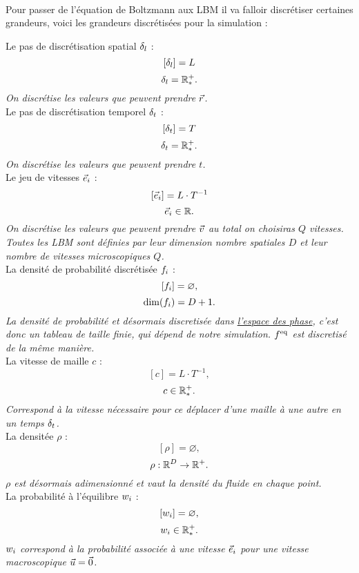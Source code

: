\paragraph*{}
  Pour passer de l'équation de Boltzmann aux LBM il va falloir discrétiser certaines grandeurs, voici les grandeurs
  discrétisées pour la simulation :
  \begin{itemize} \label{eq:defsim}
    \itemb Le pas de discrétisation spatial $\delta_l$ :
    $$[\delta_l] = L$$
    $$\delta_l = \mathbb{R}^+_*.$$
    \emph{On discrétise les valeurs que peuvent prendre $\vec{r}$.}\\
    \itemb Le pas de discrétisation temporel $\delta_t$ :
    $$[\delta_t] = T$$
    $$\delta_t = \mathbb{R}^+_*.$$
    \emph{On discrétise les valeurs que peuvent prendre $t$.}\\
    \itemb Le jeu de vitesses $\vec{e}_i$ :
    $$[\vec{e}_i] = L \cdot T^{-1}$$
    $$\vec{e}_i \in \mathbb{R}.$$
    \emph{On discrétise les valeurs que peuvent prendre $\vec{v}$ au total on choisiras $Q$ vitesses. Toutes les LBM sont 
    définies par leur dimension nombre spatiales $D$ et leur nombre de vitesses microscopiques $Q$.}\\
    \itemb La densité de probabilité discrétisée $f_i$ :
    $$[f_i] =  \varnothing,$$
    $$\dim(f_i) = D+1.$$
    \emph{La densité de probabilité et désormais discretisée dans
    \href{https://fr.wikipedia.org/wiki/Espace_des_phases}{l'espace des phase}, c'est donc un tableau de taille finie, 
    qui dépend de notre simulation. $f^{\text{eq}}$ est discretisé de la même manière.}\\
    \itemb La vitesse de maille $c$ :
    $$[c] = L\cdot T^{-1},$$
    $$c \in \mathbb{R}^+_*.$$
    \emph{Correspond à la vitesse nécessaire pour ce déplacer d'une maille à une autre en un temps $\delta_t$.}\\
    \itemb La densitée $\rho$ :
    $$[\rho] = \varnothing,$$
    $$\rho : \mathbb{R}^D \to \mathbb{R}^+.$$
    \emph{$\rho$ est désormais adimensionné et vaut la densité du fluide en chaque point.}\\
    \itemb La probabilité à l'équilibre $w_i$ :
    $$[w_i] = \varnothing,$$
    $$w_i \in \mathbb{R}^+_*.$$
    \emph{$w_i$ correspond à la probabilité associée à une vitesse $\vec{e}_i$ pour une vitesse macroscopique $\vec{u} = \vec{0}$.}\\
  \end{itemize}